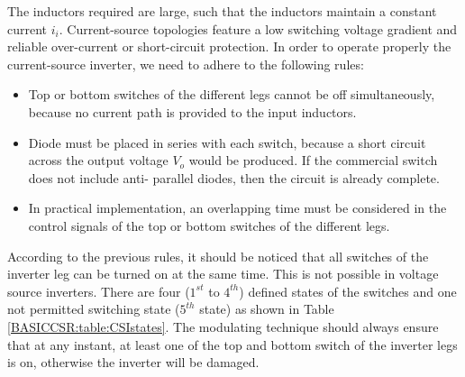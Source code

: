 {The inductors required are large, such that the inductors
maintain a constant current $i_i$. Current-source topologies feature a low switching voltage gradient and reliable over-current or short-circuit protection. In order to operate properly the current-source inverter, we need to adhere to the following rules:
\begin{itemize}
\item Top or bottom switches of the different legs cannot be off simultaneously, because no current path is provided to the input inductors.
\item Diode must be placed in series with each switch, because a short circuit across the output voltage $V_o$ would be produced. If the commercial switch does not include anti- parallel diodes, then the circuit is already complete.
\item In practical implementation, an overlapping time must be considered in the control signals of the top or bottom switches of the different legs.
\end{itemize}

According to the previous rules, it should be noticed that all switches of the inverter leg can be turned on at the same time. This is not possible in voltage source inverters. There are four ($1^{st}$ to $4^{th}$) defined states of the switches and one not permitted switching state ($5^{th}$ state) as shown in Table \ref{BASICCSR:table:CSIstates}. The modulating technique should always ensure that at any instant, at least one of the top and bottom switch of the inverter legs is on, otherwise the inverter will be damaged.

}
